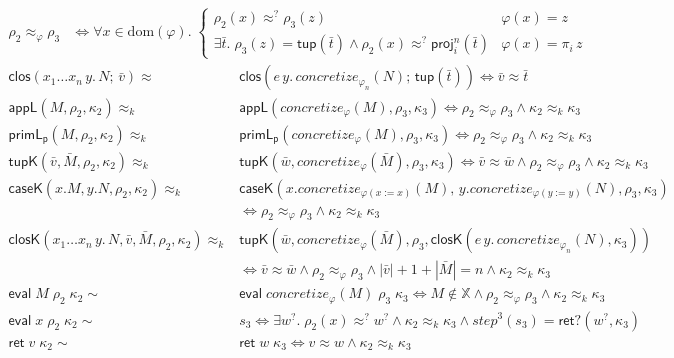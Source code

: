 \documentclass[10pt]{article}
\theoremstyle{acmplain}
\newcommand{\key}[1]{\mathsf{#1}}
\newcommand{\pass}[1]{\mathit{#1}}
\newcommand{\prj}[1]{\pi_{#1}\,}
\newcommand{\X}{\mathbb{X}}
\newcommand{\ext}[3]{#1(#2{:=}#3)}
\newcommand{\ev}[3]{\key{eval}\;#1\;#2\;#3}
\newcommand{\rt}[2]{\key{ret}\;#1\;#2}
\newcommand{\retq}{\key{ret?}}
\newcommand{\step}[1]{\mathit{step}^{#1}}
\newcommand{\closV}[2]{\key{clos}(#1;\, #2)}
\newcommand{\tupV}[1]{\key{tup}(#1)}
\newcommand{\Kf}[2]{\key{#1}(#2)}
\newcommand{\approxk}{\approx_k}
\newcommand{\approxq}{\approx^{?}}
\begin{document}
\begin{align*}
  \rho_2 \approx_\varphi \rho_3 &\iff \forall x \in \mathrm{dom}(\varphi).\;
    \begin{cases}
      \rho_2(x) \approxq \rho_3(z) & \varphi(x) = z \\
      \exists \bar{t}.\; \rho_3(z) = \tupV{\bar{t}} \land \rho_2(x) \approxq \key{proj}^n_i(\bar{t})
        & \varphi(x) = \prj{i} z
    \end{cases}
\end{align*}
\begin{align*}
  \closV{x_1 \ldots x_n\, y.\, N}{\bar{v}} \approx {}&
    \closV{e\, y.\, \pass{concretize}_{\varphi_n}(N)}{\tupV{\bar{t}}}
    \iff \bar{v} \approx \bar{t} \\[1ex]
  \Kf{appL}{M, \rho_2, \kappa_2} \approxk {}&
    \Kf{appL}{\pass{concretize}_\varphi(M), \rho_3, \kappa_3}
    \iff \rho_2 \approx_\varphi \rho_3 \land \kappa_2 \approxk \kappa_3 \\
  \Kf{primL_p}{M, \rho_2, \kappa_2} \approxk {}&
    \Kf{primL_p}{\pass{concretize}_\varphi(M), \rho_3, \kappa_3}
    \iff \rho_2 \approx_\varphi \rho_3 \land \kappa_2 \approxk \kappa_3 \\
  \Kf{tupK}{\bar{v}, \bar{M}, \rho_2, \kappa_2} \approxk {}&
    \Kf{tupK}{\bar{w}, \pass{concretize}_\varphi(\bar{M}), \rho_3, \kappa_3}
    \iff \bar{v} \approx \bar{w} \land \rho_2 \approx_\varphi \rho_3 \land \kappa_2 \approxk \kappa_3 \\
  \Kf{caseK}{x.M, y.N, \rho_2, \kappa_2} \approxk {}&
    \Kf{caseK}{x.\pass{concretize}_{\ext{\varphi}{x}{x}}(M),\,
               y.\pass{concretize}_{\ext{\varphi}{y}{y}}(N), \rho_3, \kappa_3} \\
    &\iff \rho_2 \approx_\varphi \rho_3 \land \kappa_2 \approxk \kappa_3 \\
  \Kf{closK}{x_1 \ldots x_n\, y.\, N, \bar{v}, \bar{M}, \rho_2, \kappa_2} \approxk {}&
    \Kf{tupK}{\bar{w}, \pass{concretize}_\varphi(\bar{M}), \rho_3,
      \Kf{closK}{e\, y.\, \pass{concretize}_{\varphi_n}(N), \kappa_3}} \\
    &\iff \bar{v} \approx \bar{w} \land \rho_2 \approx_\varphi \rho_3
      \land |\bar{v}| + 1 + |\bar{M}| = n \land \kappa_2 \approxk \kappa_3 \\[1ex]
  \ev{M}{\rho_2}{\kappa_2} \sim {}& \ev{\pass{concretize}_\varphi(M)}{\rho_3}{\kappa_3}
    \iff M \notin \X \land \rho_2 \approx_\varphi \rho_3 \land \kappa_2 \approxk \kappa_3 \\
  \ev{x}{\rho_2}{\kappa_2} \sim {}& s_3
    \iff \exists w^?.\; \rho_2(x) \approxq w^? \land \kappa_2 \approxk \kappa_3
      \land \step{3}(s_3) = \retq(w^?, \kappa_3) \\
  \rt{v}{\kappa_2} \sim {}& \rt{w}{\kappa_3} \iff v \approx w \land \kappa_2 \approxk \kappa_3
\end{align*}
\end{document}
